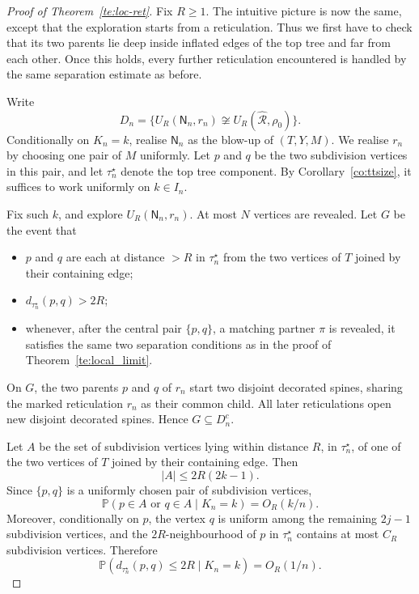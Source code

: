 \documentclass[english,11pt]{smfart}
\newcommand{\Prb}[1]{\mathbb{P}\left(#1\right)}
\newcommand{\convdis}{\,{\buildrel \mathrm{d} \over \longrightarrow}\,}
\newcommand{\cR}{\mathcal{R}}
\newcommand{\mN}{\mathsf{N}}
\newtheorem{theorem}{Theorem}[section]
\numberwithin{equation}{section}
\begin{document}

\begin{proof}[Proof of Theorem~\ref{te:loc-ret}]
Fix \(R\ge1\). The intuitive picture is now the same, except that the
exploration starts from a reticulation. Thus we first have to check that its
two parents lie deep inside inflated edges of the top tree and far from each
other. Once this holds, every further reticulation encountered is handled by
the same separation estimate as before.

Write
\[
  D_n=\{U_R(\mN_n,r_n)\not\cong U_R(\hat{\cR},\rho_0)\}.
\]
Conditionally on \(K_n=k\), realise \(\mN_n\) as the blow-up of \((T,Y,M)\).
We realise \(r_n\) by choosing one pair of \(M\) uniformly. Let \(p\) and \(q\)
be the two subdivision vertices in this pair, and let \(\tau_n^{\star}\) denote the top
tree component. By Corollary~\ref{co:ttsize}, it suffices to work uniformly on
\(k\in I_n\).

\smallskip
Fix such \(k\), and explore \(U_R(\mN_n,r_n)\). At most \(N\) vertices are
revealed. Let \(G\) be the event that
\begin{itemize}\itemsep0pt
\item \(p\) and \(q\) are each at distance \(>R\) in \(\tau_n^{\star}\) from the two
  vertices of \(T\) joined by their containing edge;
\item \(d_{\tau_n^{\star}}(p,q)>2R\);
\item whenever, after the central pair \(\{p,q\}\), a matching partner \(\pi\)
  is revealed, it satisfies the same two separation conditions as in the proof
  of Theorem~\ref{te:local_limit}.
\end{itemize}
On \(G\), the two parents \(p\) and \(q\) of \(r_n\) start two disjoint
decorated spines, sharing the marked reticulation \(r_n\) as their common
child. All later reticulations open new disjoint decorated spines. Hence
\(G\subseteq D_n^c\).

\smallskip
Let \(A\) be the set of subdivision vertices lying within distance \(R\), in
\(\tau_n^{\star}\), of one of the two vertices of \(T\) joined by their containing
edge. Then
\[
  |A|\le 2R(2k-1).
\]
Since \(\{p,q\}\) is a uniformly chosen pair of subdivision vertices,
\[
  \Prb{p\in A\text{ or }q\in A\mid K_n=k}=O_R(k/n).
\]
Moreover, conditionally on \(p\), the vertex \(q\) is uniform among the
remaining \(2j-1\) subdivision vertices, and the \(2R\)-neighbourhood of \(p\)
in \(\tau_n^{\star}\) contains at most \(C_R\) subdivision vertices. Therefore
\[
  \Prb{d_{\tau_n^{\star}}(p,q)\le2R\mid K_n=k}=O_R(1/n).
\]


\end{proof}
\end{document}
